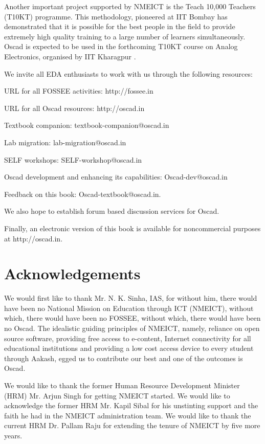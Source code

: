 Another important project supported by NMEICT is the Teach 10,000
Teachers (T10KT) programme.  This methodology, pioneered at IIT Bombay
\cite{T10KT,T10KT-kal} has demonstrated that it is possible for the best people
in the field to provide extremely high quality training to a large
number of learners simultaneously.  Oscad is expected to be used in
the forthcoming T10KT course on Analog Electronics, organised by IIT
Kharagpur \cite{T10KT-kgp}.

We invite all EDA enthusiasts to work with us through the following
resources:
\begin{inparaenum}
\item URL for all FOSSEE activities: http://fossee.in
\item URL for all Oscad resources: http://oscad.in 
\item Textbook companion: textbook-companion@oscad.in
\item Lab migration: lab-migration@oscad.in
\item SELF workshops: SELF-workshop@oscad.in
\item Oscad development and enhancing its capabilities:
  Oscad-dev@oscad.in 
\item Feedback on this book: Oscad-textbook@oscad.in.
\end{inparaenum}
We also hope to establish forum based discussion services for
Oscad.  

Finally, an electronic version of this book is available for
noncommercial purposes at http://oscad.in.

\clearpage
\section*{Acknowledgements}
We would first like to thank Mr. N. K. Sinha, IAS, for without him,
there would have been no National Mission on Education through ICT
(NMEICT), without which, there would have been no FOSSEE, without
which, there would have been no Oscad.  The idealistic guiding
principles of NMEICT, namely, reliance on open source software,
providing free access to e-content, Internet connectivity for all
educational institutions and providing a low cost access device to
every student through Aakash, egged us to contribute our best and one
of the outcomes is Oscad.

We would like to thank the former Human Resource Development Minister
(HRM) Mr. Arjun Singh for getting NMEICT started.  We would like to
acknowledge the former HRM Mr. Kapil Sibal for his unstinting support
and the faith he had in the NMEICT administration team.  We would like
to thank the current HRM Dr. Pallam Raju for extending the tenure of
NMEICT by five more years.

